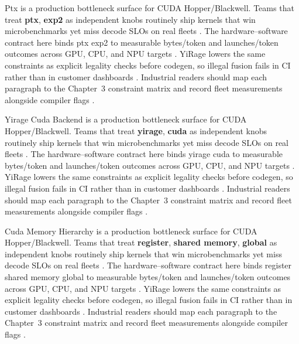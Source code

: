 Ptx is a production bottleneck surface for CUDA Hopper/Blackwell. Teams that treat \textbf{ptx}, \textbf{exp2} as independent knobs routinely ship kernels that win microbenchmarks yet miss decode SLOs on real fleets \citep{kwon2023vllm,patel2025llminference}. The hardware--software contract here binds ptx exp2 to measurable bytes/token and launches/token outcomes across GPU, CPU, and NPU targets \citep{nvidia2024cudagraphs,taxbreak2026}. YiRage lowers the same constraints as explicit legality checks before codegen, so illegal fusion fails in CI rather than in customer dashboards \citep{liu2024deepseekv3,memoryfloor2026}. Industrial readers should map each paragraph to the Chapter~3 constraint matrix and record fleet measurements alongside compiler flags \citep{patel2025llminference,nvidia2022hopper}.

Yirage Cuda Backend is a production bottleneck surface for CUDA Hopper/Blackwell. Teams that treat \textbf{yirage}, \textbf{cuda} as independent knobs routinely ship kernels that win microbenchmarks yet miss decode SLOs on real fleets \citep{nvidia2024cudagraphs,taxbreak2026}. The hardware--software contract here binds yirage cuda to measurable bytes/token and launches/token outcomes across GPU, CPU, and NPU targets \citep{liu2024deepseekv3,memoryfloor2026}. YiRage lowers the same constraints as explicit legality checks before codegen, so illegal fusion fails in CI rather than in customer dashboards \citep{patel2025llminference,nvidia2022hopper}. Industrial readers should map each paragraph to the Chapter~3 constraint matrix and record fleet measurements alongside compiler flags \citep{taxbreak2026,semianalysis2024tma}.

Cuda Memory Hierarchy is a production bottleneck surface for CUDA Hopper/Blackwell. Teams that treat \textbf{register}, \textbf{shared memory}, \textbf{global} as independent knobs routinely ship kernels that win microbenchmarks yet miss decode SLOs on real fleets \citep{liu2024deepseekv3,memoryfloor2026}. The hardware--software contract here binds register shared memory global to measurable bytes/token and launches/token outcomes across GPU, CPU, and NPU targets \citep{patel2025llminference,nvidia2022hopper}. YiRage lowers the same constraints as explicit legality checks before codegen, so illegal fusion fails in CI rather than in customer dashboards \citep{taxbreak2026,semianalysis2024tma}. Industrial readers should map each paragraph to the Chapter~3 constraint matrix and record fleet measurements alongside compiler flags \citep{memoryfloor2026,amd2024xdna}.


